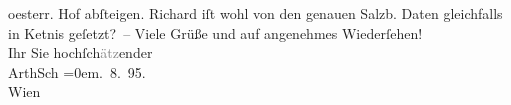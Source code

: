 \begin{ledgroupsized}[t]{13cm}
                        oesterr. Hof abſteigen. Richard iſt wohl von den genauen Salzb. Daten gleichfalls in Ke{\geminationn}tnis geſetzt? – \pend
           \pstart
           Viele Grüße und auf angenehmes Wiederſehen!{\\[\baselineskip]}Ihr Sie
                        hochſch\textcolor{gray}{ätz}ender{\\[\baselineskip]}\spacefill\mbox{ArthSch}\pend
           \leftskip=0em{}. 8. 95.{\\}Wien\pend
           \endnumbering{}\end{ledgroupsized}  \newcommand{\dateiname}{L00472}\newcommand{\titel}{Arthur Schnitzler an Lou Andreas-Salomé, 11. 8. 1895}\newcommand{\editorInnen}{Martin Anton Müller und Gerd-Hermann Susen}
      